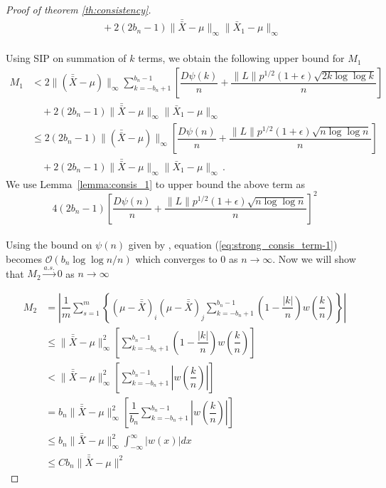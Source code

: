 \documentclass[11pt]{article}
\theoremstyle{remark}
\begin{document}
\begin{proof}[Proof of theorem \ref{th:consistency}]
\begin{align*}
    & \; \;+ 2(2b_n - 1)\|\bar{\bar{X}} - \mu\|_{\infty}\|\bar{X}_1 - \mu\|_{\infty} 
\end{align*}
\\
Using SIP on summation of $k$ terms, we obtain the following upper bound for $M_1$
\begin{align*}
M_1
    & < 2\|(\bar{\bar{X}} - \mu)\|_{\infty}\sum\limits_{k=-b_n + 1}^{b_n-1}\left[ \dfrac{D \psi(k)}{n} + \dfrac{\|L\| p^{1/2}(1+\epsilon)\sqrt{2k \log\log k}}{n}  \right] \\
    & \quad + 2(2b_n - 1)\|\bar{\bar{X}} - \mu\|_{\infty}\|\bar{X}_1 - \mu\|_{\infty} \\
    &\leq 2(2b_n - 1)\|(\bar{\bar{X}} - \mu)\|_{\infty} \left[ \dfrac{D \psi(n)}{n} + \dfrac{\|L\| p^{1/2}(1+\epsilon)\sqrt{n \log\log n}}{n}  \right]\\
    & \quad  + 2(2b_n - 1)\|\bar{\bar{X}} - \mu\|_{\infty}\|\bar{X}_1 - \mu\|_{\infty}\,.
\end{align*}
%
We use Lemma~\ref{lemma:consis_1} to upper bound the above term as
\begin{equation} \label{eq:strong_consis_term-1}
    4(2b_n - 1)\left[ \dfrac{D \psi(n)}{n} + \dfrac{\|L\| p^{1/2}(1+\epsilon)\sqrt{n \log\log n}}{n}  \right]^2
\end{equation}
\\
Using the bound on $\psi(n)$ given by \cite{stra:1964}, equation (\ref{eq:strong_consis_term-1}) becomes $\mathcal{O}\left(b_n \log \log n/n\right)$ which converges to 0 as $n \to \infty$. Now we will show that $M_2 \xrightarrow{a.s.} 0$ as $n\to \infty$

\begin{align*}
   M_2 & = \left|\dfrac{1}{m}\sum\limits_{s=1}^{m}\left\{ \left(\mu - \bar{\bar{X}} \right)_i  \left(\mu - \bar{\bar{X}} \right)_j\sum_{k=-b_n+1}^{b_n-1}\left(1-\dfrac{|k|}{n}\right)w\left(\dfrac{k}{n}\right)\right\}\right|\\
    & \leq\|\bar{\bar{X}} - \mu\|_{\infty}^2\left[\sum_{k=-b_n+1}^{b_n-1}\left(1-\dfrac{|k|}{n}\right)w\left(\dfrac{k}{n}\right)\right]\\
    &< \|\bar{\bar{X}} - \mu\|_{\infty}^2\left[\sum_{k=-b_n+1}^{b_n-1}\left|w\left(\dfrac{k}{n}\right)\right|\right]\\
    &= b_n\|\bar{\bar{X}} - \mu\|_{\infty}^2\left[\dfrac{1}{b_n}\sum_{k=-b_n+1}^{b_n-1}\left|w\left(\dfrac{k}{n}\right)\right|\right]\\
    & \leq b_n\|\bar{\bar{X}} - \mu\|_{\infty}^2 \int_{-\infty}^{\infty}|w(x)|dx \\
    & \leq Cb_n\|\bar{\bar{X}} - \mu \|^2
\end{align*}


\end{proof}
\end{document}
